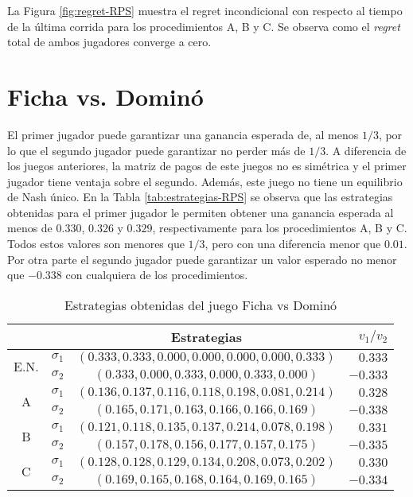 La Figura \ref{fig:regret-RPS} muestra el regret incondicional con respecto al tiempo de la última corrida para los procedimientos A, B y C. Se observa como el \textit{regret} total de ambos jugadores converge a cero.


\section{Ficha vs. Dominó}

El primer jugador puede garantizar una ganancia esperada de, al menos $1/3$, por lo que el segundo jugador puede garantizar no perder más de $1/3$. A diferencia de los juegos anteriores, la matriz de pagos de este juegos no es simétrica y el primer jugador tiene ventaja sobre el segundo. Además, este juego no tiene un equilibrio de Nash único. En la Tabla \ref{tab:estrategias-RPS} se observa que las estrategias obtenidas para el primer jugador le permiten obtener una ganancia esperada al menos de $0.330$, $0.326$ y $0.329$, respectivamente para los procedimientos A, B y C. Todos estos valores son menores que $1/3$, pero con una diferencia menor que $0.01$. Por otra parte el segundo jugador puede garantizar un valor esperado no menor que $-0.338$ con cualquiera de los procedimientos.

\begin{table}[hbt]
    \centering
    \begin{tabular}{c c|c|r}
        & & Estrategias & $v_1 / v_2$\\
        \hline
        \multirow{2}{*}{E.N.}
        & $\sigma_1$ & $(0.333, 0.333, 0.000, 0.000, 0.000, 0.000, 0.333)$ & $0.333$ \\
        & $\sigma_2$ & $(0.333, 0.000, 0.333, 0.000, 0.333, 0.000)$ &  $-0.333$\\
        \hline
        \multirow{2}{*}{A}
        & $\sigma_1$ & $(0.136, 0.137, 0.116, 0.118, 0.198, 0.081, 0.214)$ & $0.328$ \\
        & $\sigma_2$ & $(0.165, 0.171, 0.163, 0.166, 0.166, 0.169)$ & $-0.338$\\
        \hline
        \multirow{2}{*}{B}
        & $\sigma_1$ & $(0.121, 0.118, 0.135, 0.137, 0.214, 0.078, 0.198)$ & $0.331$ \\
        & $\sigma_2$ & $(0.157, 0.178, 0.156, 0.177, 0.157, 0.175)$ & $-0.335$\\
        \hline
        \multirow{2}{*}{C}
        & $\sigma_1$ & $(0.128, 0.128, 0.129, 0.134, 0.208, 0.073, 0.202)$ & $0.330$ \\
        & $\sigma_2$ & $(0.169, 0.165, 0.168, 0.164, 0.169, 0.165)$ & $-0.334$\\
        \hline
    \end{tabular}
    \caption{Estrategias obtenidas del juego Ficha vs Dominó}
    \label{tab:estrategias-domino}
\end{table}

